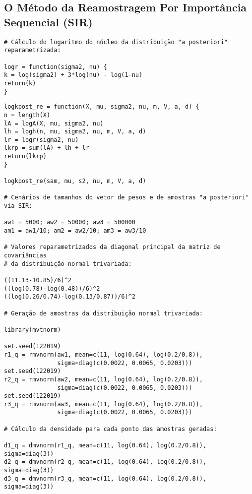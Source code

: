 \subsection*{O Método da Reamostragem Por Importância Sequencial (SIR)}

\begin{verbatim}
# Cálculo do logaritmo do núcleo da distribuição "a posteriori" reparametrizada:

logr = function(sigma2, nu) {
k = log(sigma2) + 3*log(nu) - log(1-nu)
return(k)
}
\end{verbatim}

\newpage

\begin{verbatim}
logkpost_re = function(X, mu, sigma2, nu, m, V, a, d) {
n = length(X)
lA = logA(X, mu, sigma2, nu)
lh = logh(n, mu, sigma2, nu, m, V, a, d)
lr = logr(sigma2, nu)
lkrp = sum(lA) + lh + lr
return(lkrp)
}

logkpost_re(sam, mu, s2, nu, m, V, a, d)

# Cenários de tamanhos do vetor de pesos e de amostras "a posteriori" via SIR:

aw1 = 5000; aw2 = 50000; aw3 = 500000
am1 = aw1/10; am2 = aw2/10; am3 = aw3/10

# Valores reparametrizados da diagonal principal da matriz de covariâncias
# da distribuição normal trivariada:

((11.13-10.85)/6)^2
((log(0.78)-log(0.48))/6)^2
((log(0.26/0.74)-log(0.13/0.87))/6)^2

# Geração de amostras da distribuição normal trivariada:

library(mvtnorm)

set.seed(122019)
r1_q = rmvnorm(aw1, mean=c(11, log(0.64), log(0.2/0.8)),
			   sigma=diag(c(0.0022, 0.0065, 0.0203)))
set.seed(122019)
r2_q = rmvnorm(aw2, mean=c(11, log(0.64), log(0.2/0.8)),
			   sigma=diag(c(0.0022, 0.0065, 0.0203)))
set.seed(122019)
r3_q = rmvnorm(aw3, mean=c(11, log(0.64), log(0.2/0.8)),
			   sigma=diag(c(0.0022, 0.0065, 0.0203)))

# Cálculo da densidade para cada ponto das amostras geradas:

d1_q = dmvnorm(r1_q, mean=c(11, log(0.64), log(0.2/0.8)), sigma=diag(3))
d2_q = dmvnorm(r2_q, mean=c(11, log(0.64), log(0.2/0.8)), sigma=diag(3))
d3_q = dmvnorm(r3_q, mean=c(11, log(0.64), log(0.2/0.8)), sigma=diag(3))
\end{verbatim}

\newpage

